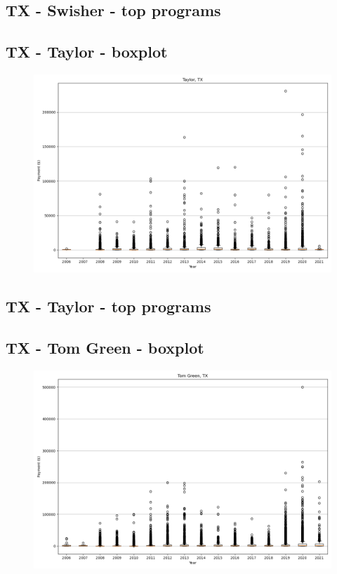 \subsection*{TX - Swisher - top programs}

\newpage
\subsection*{TX - Taylor - boxplot}
\begin{figure}[h]
\centering
\includegraphics[width=7in]{../output/boxplots/counties/Taylor-TX_boxplot.png}
\end{figure}


\subsection*{TX - Taylor - top programs}

\newpage
\subsection*{TX - Tom Green - boxplot}
\begin{figure}[h]
\centering
\includegraphics[width=7in]{../output/boxplots/counties/Tom Green-TX_boxplot.png}
\end{figure}


